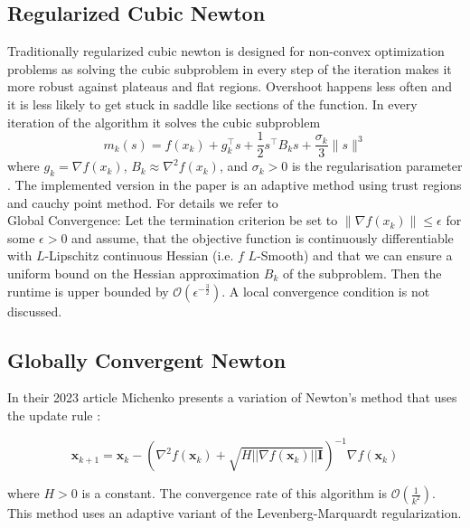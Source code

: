 \documentclass{article}
\begin{document}
\subsection{Regularized Cubic Newton}
Traditionally regularized cubic newton is designed for non-convex optimization problems as solving the cubic subproblem in every step of the iteration makes it more robust against plateaus and flat regions. Overshoot happens less often and it is less likely to get stuck in saddle like sections of the function. In every iteration of the algorithm it solves the cubic subproblem
\[
m_k(s) = f(x_k) + g_k^\top s + \frac{1}{2} s^\top B_k s + \frac{\sigma_k}{3} \|s\|^3
\]
where \( g_k = \nabla f(x_k) \), \( B_k \approx \nabla^2 f(x_k) \), and \( \sigma_k > 0 \) is the regularisation parameter \cite{cartis}. The implemented version in the paper is an adaptive method using trust regions and cauchy point method. For details we refer to \cite{cartis}\\
Global Convergence: Let the termination criterion be set to  $\|\nabla f(x_k)\|\leq \epsilon$ for some $\epsilon > 0$ and assume, that the objective function is continuously differentiable with $L$-Lipschitz continuous Hessian (i.e. $f$ $L$-Smooth) and that we can ensure a uniform bound on the Hessian approximation $B_k$ of the subproblem. Then the runtime is upper bounded by $\mathcal{O}(\epsilon ^{-\frac{3}{2}})$. A local convergence condition is not discussed.

\subsection{Globally Convergent Newton}

In their 2023 article Michenko presents a variation of Newton's method that uses the update rule \cite{mishchenko2023regularized}:

\begin{equation}
\mathbf{x}_{k+1} = \mathbf{x}_{k} - ( \nabla^2 f(\mathbf{x}_k) + \sqrt{ H ||\nabla f(\mathbf{x}_k)||\mathbf{I}})^{-1} \nabla f(\mathbf{x}_k)
  \label{eq:regularized-newton}
\end{equation}

where $H > 0$ is a constant. The convergence rate of this algorithm is $\mathcal{O}(\frac{1}{k^2})$. This method uses an adaptive variant of the Levenberg-Marquardt regularization. 
\newpage
\end{document}
